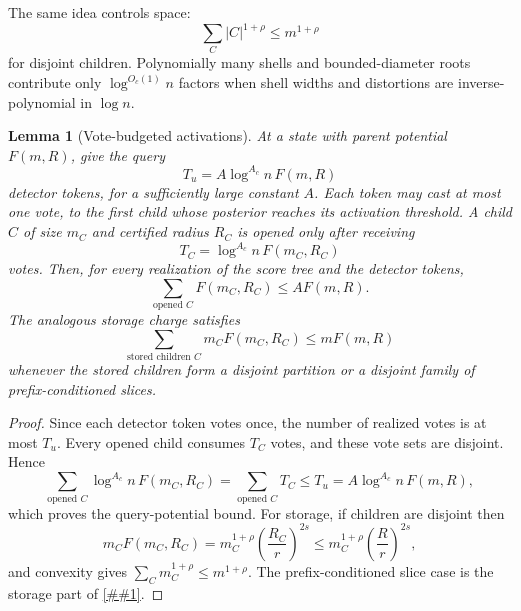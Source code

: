 \documentclass[10pt]{article}
\newcommand{\cref}[1]{\ref{##1}}
\newtheorem{lemma}[theorem]{Lemma}
\theoremstyle{definition}
\begin{document}
The same idea controls space:
\[
   \sum_C |C|^{1+\rho}
   \le
   m^{1+\rho}
\]
for disjoint children. Polynomially many shells and bounded-diameter roots contribute only $\log^{O_c(1)}n$ factors when shell widths and distortions are inverse-polynomial in $\log n$.

\begin{lemma}[Vote-budgeted activations]\label{lem:vote-budget}
   At a state with parent potential $F(m,R)$, give the query
   \[
      T_u=A\log^{A_c}n\,F(m,R)
   \]
   detector tokens, for a sufficiently large constant $A$. Each token may cast at most one vote, to the first child whose posterior reaches its activation threshold. A child $C$ of size $m_C$ and certified radius $R_C$ is opened only after receiving
   \[
      T_C=\log^{A_c}n\,F(m_C,R_C)
   \]
   votes. Then, for every realization of the score tree and the detector tokens,
   \[
      \sum_{\text{opened }C}F(m_C,R_C)\le A F(m,R).
   \]
   The analogous storage charge satisfies
   \[
      \sum_{\text{stored children }C} m_C F(m_C,R_C)\le mF(m,R)
   \]
   whenever the stored children form a disjoint partition or a disjoint family of prefix-conditioned slices.
\end{lemma}

\begin{proof}
   Since each detector token votes once, the number of realized votes is at most $T_u$. Every opened child consumes $T_C$ votes, and these vote sets are disjoint. Hence
   \[
      \sum_{\text{opened }C}\log^{A_c}n\,F(m_C,R_C)
      =
      \sum_{\text{opened }C}T_C
      \le
      T_u
      =
      A\log^{A_c}n\,F(m,R),
   \]
   which proves the query-potential bound. For storage, if children are disjoint then
   \[
      m_C F(m_C,R_C)
      =
      m_C^{1+\rho}\left(\frac{R_C}{r}\right)^{2s}
      \le
      m_C^{1+\rho}\left(\frac Rr\right)^{2s},
   \]
   and convexity gives $\sum_Cm_C^{1+\rho}\le m^{1+\rho}$. The prefix-conditioned slice case is the storage part of \cref{lem:prefix-slice-accounting}.
\end{proof}
\end{document}
